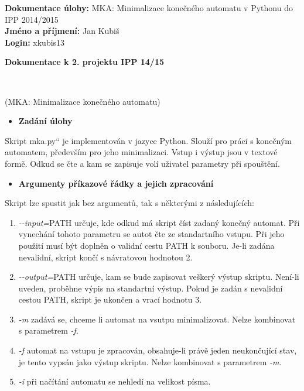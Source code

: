 \documentclass[11pt,a4paper]{article}
\providecommand{\uvoz}[1]{\quotedblbase #1\textquotedblleft}
\begin{document}
\noindent \textbf{Dokumentace úlohy:} MKA: Minimalizace konečného automatu v Pythonu do IPP 2014/2015\\
\textbf{Jméno a příjmení:} Jan Kubiš\\
\textbf{Login:} xkubis13\\
\smallskip
\begin{center}
	\begin{LARGE}\textbf{Dokumentace k 2. projektu IPP 14/15}\end{LARGE}\\
	\begin{large}(MKA: Minimalizace konečného automatu)\end{large}
\end{center}
\bigskip

\begin{itemize}[leftmargin=0cm]
\item{\textbf{Zadání úlohy}}
\end{itemize}
Skript \uvoz{mka.py} je implementován v jazyce Python. Slouží pro práci s konečným automatem, především pro jeho minimalizaci. Vstup i výstup jsou v textové formě. Odkud se čte a kam se zapisuje volí uživatel parametry při spouštění.

\begin{itemize}[leftmargin=0cm]
\item{\textbf{Argumenty příkazové řádky a jejich zpracování}}
\end{itemize}
Skript lze spustit jak bez argumentů, tak s některými z následujících:
	\begin{enumerate}
	\item \emph{-\--input=}PATH určuje, kde odkud má skript číst zadaný konečný automat. Při vynechání tohoto parametru se autot čte ze standartního vstupu. Při jeho použití musí být doplněn o validní cestu PATH k souboru. Je-li zadána nevalidní, skript končí s návratovou hodnotou 2.
	
	\item \emph{-\--output=}PATH určuje, kam se bude zapisovat veškerý výstup skriptu. Není-li uveden, proběhne výpis na standartní výstup. Pokud je zadán s nevalidní cestou PATH, skript je ukončen a vrací hodnotu 3.
	\item \emph{-m} zadává se, chceme li automat na vsutpu minimalizovat. Nelze kombinovat s parametrem \emph{-f}.
	\item \emph{-f} automat na vstupu je zpracován, obsahuje-li právě jeden neukončující stav, je tento vypsán jako výstup skriptu. Nelze kombinovat s parametrem \emph{-m}.
	\item \emph{-i} při načítání automatu se nehledí na velikost písma.
	\end{enumerate}
\end{document}
